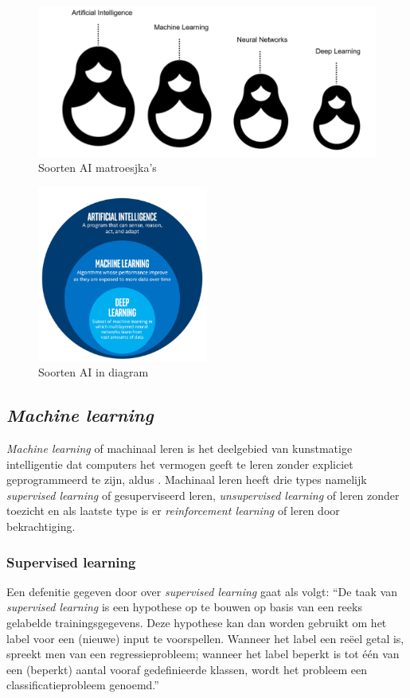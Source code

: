\begin{figure}
    \includegraphics[width=\linewidth]{./img/RussianNestingDollsAI.png}
    \caption{\label{fig:1} Soorten AI matroesjka's \autocite{Kavlakoglu2020}}
\end{figure}

\begin{figure}
    \centering
    \includegraphics[width=0.5\textwidth]{./img/ai_fields.png}
    \caption{\label{fig:2} Soorten AI in diagram \autocite{Bansal2019}}
\end{figure}

\subsection{\textit{Machine learning}}
\textit{Machine learning} of machinaal leren is het deelgebied van kunstmatige intelligentie dat computers het vermogen geeft te leren zonder expliciet geprogrammeerd te zijn, aldus \textcite{Lievens2021}. Machinaal leren heeft drie types namelijk \textit{supervised learning} of gesuperviseerd leren, \textit{unsupervised learning} of leren zonder toezicht en als laatste type is er \textit{reinforcement learning} of leren door bekrachtiging.

\subsubsection{Supervised learning}
Een defenitie gegeven door \textcite{Lievens2021} over \textit{supervised learning} gaat als volgt: ``De taak van \textit{supervised learning} is een hypothese op te bouwen op basis van een reeks gelabelde trainingsgegevens. Deze hypothese kan dan worden gebruikt om het label voor een (nieuwe) input te voorspellen. Wanneer het label een reëel getal is, spreekt men van een regressieprobleem; wanneer het label beperkt is tot één van een (beperkt) aantal vooraf gedefinieerde klassen, wordt het probleem een classificatieprobleem genoemd.''

